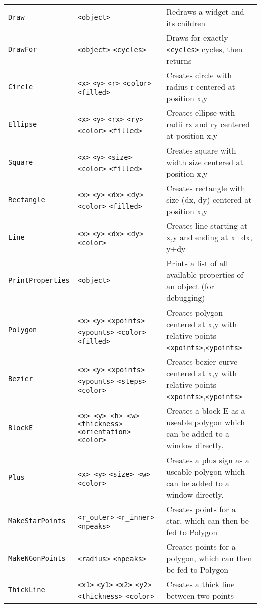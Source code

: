 \begin{longtable}{p{3cm}p{3cm}p{6cm}}
\verb+Draw+ &\verb+<object>+ &Redraws a widget and its children\\ 
\verb+DrawFor+ &\verb+<object>+ \verb+<cycles>+ &Draws for exactly \verb+<cycles>+ cycles, then returns\\ 
\verb+Circle+ &\verb+<x>+ \verb+<y>+ \verb+<r>+  \verb+<color>+ \verb+<filled>+&Creates circle with radius r centered at position x,y\\ 
\verb+Ellipse+ &\verb+<x>+ \verb+<y>+ \verb+<rx>+ \verb+<ry>+\verb+<color>+ \verb+<filled>+&Creates ellipse with radii rx and ry centered at position x,y\\ 
\verb+Square+ &\verb+<x>+ \verb+<y>+ \verb+<size>+ \verb+<color>+ \verb+<filled>+&Creates square with width size centered at position x,y\\ 
\verb+Rectangle+ &\verb+<x>+ \verb+<y>+ \verb+<dx>+ \verb+<dy>+\verb+<color>+ \verb+<filled>+ &Creates rectangle with size (dx, dy) centered at position x,y\\ 
\verb+Line+ &\verb+<x>+ \verb+<y>+ \verb+<dx>+ \verb+<dy>+  \verb+<color>+ &Creates line starting at x,y and ending at x+dx, y+dy\\ 
\verb+PrintProperties+ &\verb+<object>+ &Prints a list of all available properties of an object (for debugging)\\
\verb+Polygon+ &\verb+<x>+ \verb+<y>+ \verb+<xpoints>+ \verb+<ypounts>+  \verb+<color>+\verb+<filled>+ &Creates polygon centered at x,y with relative points \verb+<xpoints>+,\verb+<ypoints>+\\ 
\verb+Bezier+ &\verb+<x>+ \verb+<y>+ \verb+<xpoints>+ \verb+<ypounts>+ \verb+<steps>+ \verb+<color>+ &Creates bezier curve centered at x,y with relative points \verb+<xpoints>+,\verb+<ypoints>+\\ 
\verb+BlockE+         &\verb+<x> <y> <h> <w>+ \verb+<thickness>+ \verb+<orientation>+ \verb+<color>+ &Creates a block E as a useable polygon which can be added to a window directly.\\ 
\verb+Plus+           &\verb+<x> <y>+ \verb+<size> <w>+ \verb+<color>+
&Creates a plus sign as a useable polygon which can be added to a window directly.\\ 
\verb+MakeStarPoints+ &\verb+<r_outer>+ \verb+<r_inner>+ \verb+<npeaks>+ &Creates points for a star, which can then be fed to Polygon\\ 
\verb+MakeNGonPoints+ &\verb+<radius>+ \verb+<npeaks>+ &Creates points for a polygon, which can then be fed to Polygon\\ 
\verb+ThickLine+ &\verb+<x1>+ \verb+<y1>+ \verb+<x2>+ \verb+<y2>+ \verb+<thickness>+ \verb+<color>+ &Creates a thick line between two points\\ 

\end{longtable}
